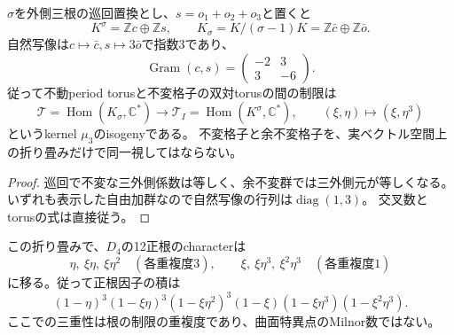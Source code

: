 \begin{proposition}[不変格子と余不変格子の指数3]
\label{prop:triality-index-three}
$\sigma$を外側三根の巡回置換とし、$s=o_1+o_2+o_3$と置くと
\[
 K^\sigma=\mathbb Zc\oplus\mathbb Zs,
 \qquad K_\sigma=K/(\sigma-1)K=\mathbb Z\bar c\oplus\mathbb Z\bar o.
\]
自然写像は$c\mapsto\bar c,s\mapsto3\bar o$で指数3であり、
\[
 \operatorname{Gram}(c,s)=\begin{pmatrix}-2&3\\3&-6\end{pmatrix}.
\]
従って不動period torusと不変格子の双対torusの間の制限は
\begin{equation}\label{eq:triality-isogeny}
 \mathcal T=\operatorname{Hom}(K_\sigma,\mathbb C^*)\longrightarrow
 \mathcal T_I=\operatorname{Hom}(K^\sigma,\mathbb C^*),
 \qquad(\xi,\eta)\longmapsto(\xi,\eta^3)
\end{equation}
というkernel $\mu_3$のisogenyである。
不変格子と余不変格子を、実ベクトル空間上の折り畳みだけで同一視してはならない。
\end{proposition}
\begin{proof}
巡回で不変な三外側係数は等しく、余不変群では三外側元が等しくなる。
いずれも表示した自由加群なので自然写像の行列は$\operatorname{diag}(1,3)$。
交叉数とtorusの式は直接従う。
\end{proof}

この折り畳みで、$D_4$の12正根のcharacterは
\[
 \eta,\ \xi\eta,\ \xi\eta^2\quad(\text{各重複度3}),\qquad
 \xi,\ \xi\eta^3,\ \xi^2\eta^3\quad(\text{各重複度1})
\]
に移る。従って正根因子の積は
\[
 (1-\eta)^3(1-\xi\eta)^3(1-\xi\eta^2)^3
 (1-\xi)(1-\xi\eta^3)(1-\xi^2\eta^3).
\]
ここでの三重性は根の制限の重複度であり、曲面特異点のMilnor数ではない。

